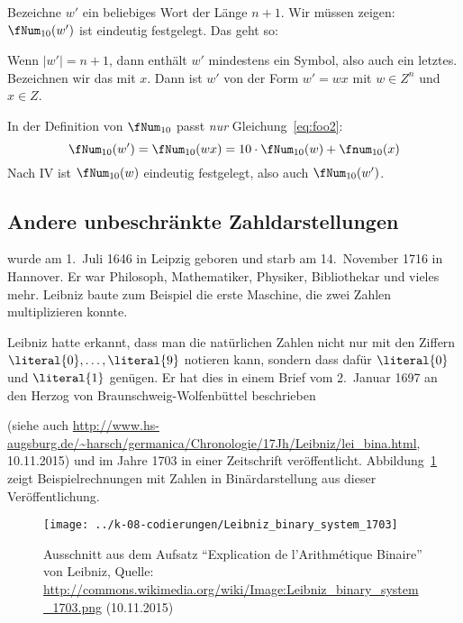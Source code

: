 \begin{tutorium}
\begin{itemize}
\begin{beweis}
\begin{description}
        Bezeichne $w'$ ein beliebiges Wort der Länge $n+1$. Wir müssen
        zeigen: $\fNum_{10}(w')$ ist eindeutig festgelegt. Das geht
        so:

        Wenn $|w'|=n+1$, dann enthält $w'$ mindestens ein Symbol, also
        auch ein letztes. Bezeichnen wir das mit $x$. Dann ist $w'$ von
        der Form $w'=wx$ mit $w\in Z^n$ und $x\in Z$.

        In der Definition von $\fNum_{10}$ passt \emph{nur} Gleichung~\ref{eq:foo2}:
        \[
        \fNum_{10}(w')=\fNum_{10}(wx) = 10\cdot \fNum_{10}(w) + \fnum_{10}(x)
        \]
        Nach IV ist $\fNum_{10}(w)$ eindeutig festgelegt, also auch
        $\fNum_{10}(w')$.
    \end{description}
    \end{beweis}
  \end{itemize}
\end{tutorium}



\Tut\subsection{Andere unbeschr\"ankte Zahldarstellungen}

\begin{window}
\noindent{} wurde am 1.~Juli 1646 in Leipzig geboren
und starb am 14.~November 1716 in Hannover. Er war Philosoph,
Mathematiker, Physiker, Bibliothekar und vieles mehr.  Leibniz baute
zum Beispiel die erste Maschine, die zwei Zahlen multiplizieren
konnte.

Leibniz hatte erkannt, dass man die natürlichen Zahlen nicht nur mit
den Ziffern $\literal{0}, \dots, \literal{9}$ notieren kann, sondern
dass dafür $\literal{0}$ und $\literal{1}$ genügen. Er hat dies in
einem Brief vom 2.~Januar 1697 an den Herzog von
Braunschweig-Wolfenbüttel beschrieben
\end{window}
(siehe auch
\url{http://www.hs-augsburg.de/~harsch/germanica/Chronologie/17Jh/Leibniz/lei_bina.html},
10.11.2015) und im Jahre 1703 in einer Zeitschrift veröffentlicht.
Abbildung~\ref{abb:leibniz-binaer} zeigt Beispielrechnungen mit Zahlen
in Binärdarstellung aus dieser Veröffentlichung.

\begin{figure}[ht]
  \centering
  \texttt{[image: ../k-08-codierungen/Leibniz\_binary\_system\_1703]}
  \caption{Ausschnitt aus dem Aufsatz "`Explication de l'Arithmétique
    Binaire"' von Leibniz, Quelle:
    \url{http://commons.wikimedia.org/wiki/Image:Leibniz_binary_system_1703.png}
    (10.11.2015)}
  \label{abb:leibniz-binaer}
\end{figure}

